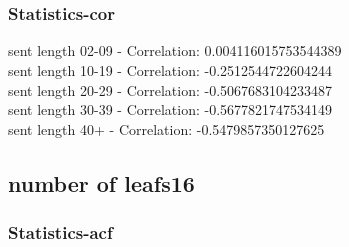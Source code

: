 \documentclass{article}%
\begin{document}
\begin{figure}[ht]%
\centering%
\setlength{\abovecaptionskip}{-35pt}%
%
%
\\%
%
%
\\%
%
\end{figure}

%
\newpage%
\subsubsection{Statistics{-}cor}%
\label{ssubsec:Statistics{-}cor}%
\noindent%
sent length 02-09 - Correlation: 0.004116015753544389\\%
sent length 10-19 - Correlation: -0.2512544722604244\\%
sent length 20-29 - Correlation: -0.5067683104233487\\%
sent length 30-39 - Correlation: -0.5677821747534149\\%
sent length 40+ - Correlation: -0.5479857350127625\\

%
\newpage

%
\subsection{number of leafs16}%
\label{subsec:numberofleafs16}%
\subsubsection{Statistics{-}acf}%
\label{ssubsec:Statistics{-}acf}%
\end{document}
